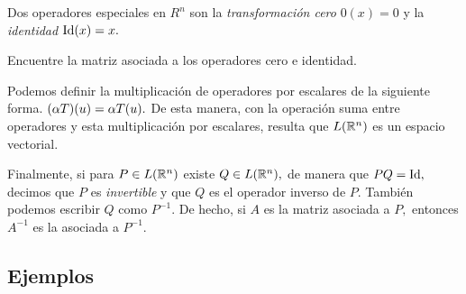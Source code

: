 Dos operadores especiales en $R^{n}$ son la \emph{transformaci\'on cero} $0(x)=0$ y la \emph{identidad} $\operatorname{Id}(x)=x.$
\begin{resuelto}[\dag]
 Encuentre la matriz asociada a los operadores cero e identidad.
\end{resuelto}

Podemos definir la multiplicaci\'on de operadores por escalares de la siguiente forma. $(\alpha T)(u)=\alpha T(u).$ De esta
manera, con la operaci\'on suma entre operadores y esta multiplicaci\'on por escalares, resulta que $L(\mathbb{R}^{n})$ es un
espacio vectorial.

Finalmente, si para $P\in L(\mathbb{R}^{n})$ existe $Q\in L(\mathbb{R}^{n}),$ de manera que $PQ=\operatorname{Id},$ decimos que $P$ es
\emph{invertible} y que $Q$ es el operador inverso de $P.$ Tambi\'en podemos escribir $Q$ como $P^{-1}.$
De hecho, si $A$ es la matriz asociada a $P,$ entonces $A^{-1}$ es la asociada a $P^{-1}.$




\subsection*{Ejemplos}

